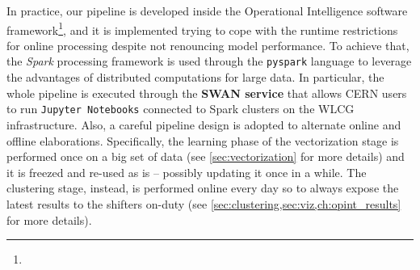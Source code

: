 In practice, our pipeline is developed inside the Operational Intelligence software framework\footnote{\githubpyspark}, and it is implemented trying to cope with the runtime restrictions for online processing despite not renouncing model performance.
To achieve that, the \textit{Spark} \cite{zaharia2010spark} processing framework is used through the \texttt{pyspark} language to leverage the advantages of distributed computations for large data. 
In particular, the whole pipeline is executed through the \textbf{SWAN service} \cite{piparo2018swan} that allows CERN users to run \texttt{Jupyter Notebooks} connected to Spark clusters on the WLCG infrastructure.
Also, a careful pipeline design is adopted to alternate online and offline elaborations.
Specifically, the learning phase of the vectorization stage is performed once on a big set of data (see \cref{sec:vectorization} for more details) and it is freezed and re-used as is -- possibly updating it once in a while.
The clustering stage, instead, is performed online every day so to always expose the latest results to the shifters on-duty (see %
\cref{sec:clustering,sec:viz,ch:opint_results}
for more details).
